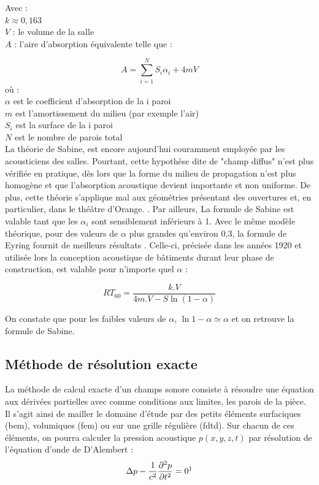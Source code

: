 Avec : \\
$k \approx 0,163$ \\
$V$ : le volume de la salle\\
$A$ : l'aire d'absorption équivalente telle que : 

\begin{equation}
   	A = \sum_{i=1}^N S_{i}\alpha_{i} + 4mV
\end{equation}
où : \\
$\alpha$ est le coefficient d'absorption de la i paroi \\
$m$ est l'amortissement du milieu (par exemple l'air) \\
$S_{i}$ est la surface de la i paroi \\
$N$ est le nombre de parois total \\

La théorie de Sabine, est encore aujourd'hui couramment employée par les acousticiens des salles. Pourtant, cette hypothèse dite de "champ diffus" n’est plus vérifiée en pratique, dès lors que la forme du milieu de propagation n’est plus homogène et que l’absorption acoustique devient importante et non uniforme. De plus, cette théorie s’applique mal aux géométries présentant des ouvertures et, en particulier, dans le théâtre d'Orange. \cite[p. 60]{picaut}. Par ailleurs, La formule de Sabine est valable tant que les $\alpha_i$ sont sensiblement inférieurs à 1. Avec le même modèle théorique, pour des valeurs de $\alpha$ plus grandes qu'environ 0,3, la formule de Eyring fournit de meilleurs résultats \cite[p. 217-241]{eyring}. Celle-ci, précisée dans les années 1920 et utilisée lors la conception acoustique de bâtiments durant leur phase de construction, est valable pour n'importe quel $\alpha$ :

\begin{equation}
   	RT_{60} = \frac{k.V}{4m.V - S\ln{(1-\alpha)}}
\end{equation}

On constate que pour les faibles valeurs de $\alpha$, $\ln{1-\alpha} \simeq \alpha$ et on retrouve la formule de Sabine.
 
	\subsection{Méthode de résolution exacte} \label{sect_resExacte}

La méthode de calcul exacte d'un champs sonore consiste à résoudre une équation aux dérivées partielles avec comme conditions aux limites, les parois de la pièce. Il s'agit ainsi de mailler le domaine d'étude par des petits éléments surfaciques (\gls{bem}), volumiques (\gls{fem}) ou sur une grille régulière (\gls{fdtd}). Sur chacun de ces éléments, on pourra calculer la pression acoustique $p(x,y,z,t)$ par résolution de l'équation d'onde de D'Alembert :
\begin{equation} 
\Delta p-\frac{1}{c^2}\frac{\partial^2p}{\partial t^2} = 0
\footnotemark
\label{alembert}
\end{equation}

